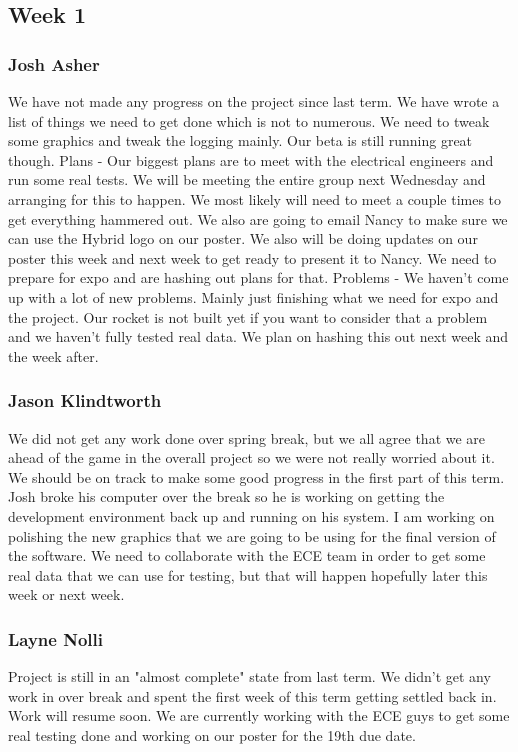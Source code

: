\documentclass[10pt,draftclsnofoot,onecolumn]{IEEEtran}
\begin{document}
\subsection{Week 1}
\subsubsection{Josh Asher}
 We have not made any progress on the project since last term. We have wrote a list of things we need to get done which is not to numerous. We need to tweak some graphics and tweak the logging mainly. Our beta is still running great though. Plans - Our biggest plans are to meet with the electrical engineers and run some real tests. We will be meeting the entire group next Wednesday and arranging for this to happen. We most likely will need to meet a couple times to get everything hammered out. We also are going to email Nancy to make sure we can use the Hybrid logo on our poster. We also will be doing updates on our poster this week and next week to get ready to present it to Nancy. We need to prepare for expo and are hashing out plans for that. Problems - We haven't come up with a lot of new problems. Mainly just finishing what we need for expo and the project. Our rocket is not built yet if you want to consider that a problem and we haven't fully tested real data. We plan on hashing this out next week and the week after. \par

\subsubsection{Jason Klindtworth} 
We did not get any work done over spring break, but we all agree that we are ahead of the game in the overall project so we were not really worried about it. We should be on track to make some good progress in the first part of this term. Josh broke his computer over the break so he is working on getting the development environment back up and running on his system. I am working on polishing the new graphics that we are going to be using for the final version of the software. We need to collaborate with the ECE team in order to get some real data that we can use for testing, but that will happen hopefully later this week or next week.\par

\subsubsection{Layne Nolli}
Project is still in an "almost complete" state from last term. We didn't get any work in over break and spent the first week of this term getting settled back in. Work will resume soon. We are currently working with the ECE guys to get some real testing done and working on our poster for the 19th due date. \par
\end{document}
